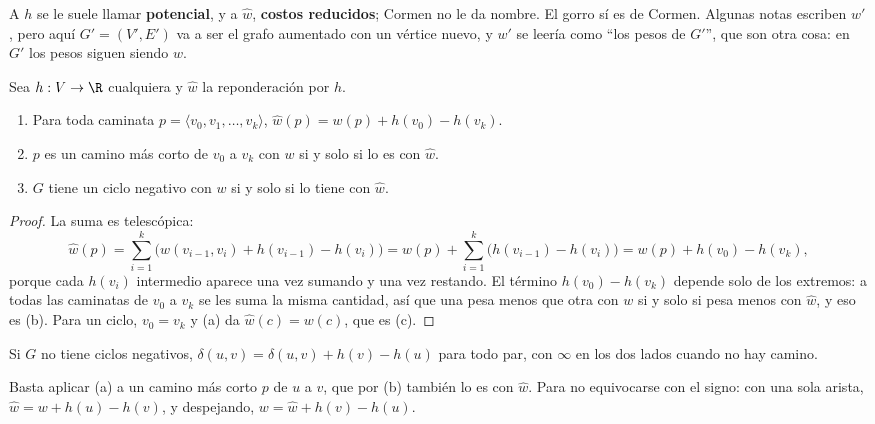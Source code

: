 \documentclass[11pt,letterpaper]{article}
\begin{document}
A $h$ se le suele llamar \textbf{potencial}, y a $\hat{w}$,
\textbf{costos reducidos}; Cormen no le da nombre. El gorro sí es de
Cormen. Algunas notas escriben $w'$, pero aquí $G' = (V', E')$ va a
ser el grafo aumentado con un vértice nuevo, y $w'$ se leería como
``los pesos de $G'$'', que son otra cosa: en $G'$ los pesos siguen
siendo $w$.

\begin{lema}
  \label{lem:reponderacion-johnson}
  Sea $h : V \to \R$ cualquiera y $\hat{w}$ la reponderación por $h$.
  \begin{enumerate}[label=(\alph*), itemsep=0.1em]
    \item Para toda caminata
          $p = \langle v_0, v_1, \dots, v_k \rangle$,
          $\hat{w}(p) = w(p) + h(v_0) - h(v_k)$.
    \item $p$ es un camino más corto de $v_0$ a $v_k$ con $w$ si y
          solo si lo es con $\hat{w}$.
    \item $G$ tiene un ciclo negativo con $w$ si y solo si lo tiene
          con $\hat{w}$.
  \end{enumerate}
\end{lema}

\begin{proof}
  La suma es telescópica:
  \[
    \hat{w}(p)
    = \sum_{i=1}^{k} \bigl( w(v_{i-1}, v_i) + h(v_{i-1}) - h(v_i)
      \bigr)
    = w(p) + \sum_{i=1}^{k} \bigl( h(v_{i-1}) - h(v_i) \bigr)
    = w(p) + h(v_0) - h(v_k) ,
  \]
  porque cada $h(v_i)$ intermedio aparece una vez sumando y una vez
  restando. El término $h(v_0) - h(v_k)$ depende solo de los extremos:
  a todas las caminatas de $v_0$ a $v_k$ se les suma la misma
  cantidad, así que una pesa menos que otra con $w$ si y solo si pesa
  menos con $\hat{w}$, y eso es (b). Para un ciclo, $v_0 = v_k$ y (a)
  da $\hat{w}(c) = w(c)$, que es (c).
\end{proof}

\begin{corolario}
  \label{cor:deshacer-johnson}
  Si $G$ no tiene ciclos negativos,
  $\delta(u, v) = \hat{\delta}(u, v) + h(v) - h(u)$ para todo par, con
  $\infty$ en los dos lados cuando no hay camino.
\end{corolario}

Basta aplicar (a) a un camino más corto $p$ de $u$ a $v$, que por (b)
también lo es con $\hat{w}$. Para no equivocarse con el signo: con una
sola arista, $\hat{w} = w + h(u) - h(v)$, y despejando,
$w = \hat{w} + h(v) - h(u)$.
\end{document}
